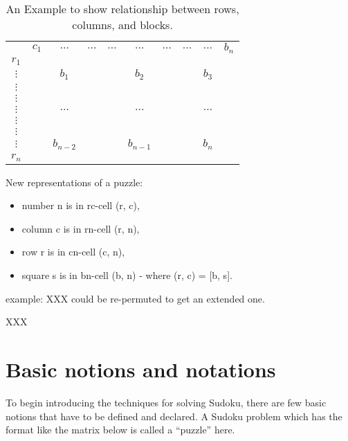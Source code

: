 \documentclass[11pt]{report}
\begin{document}
\begin{table}
\centering
\begin{tabular}{ c| c c c| c c c| c c c|}
  \multicolumn{1}{c}{} & $c_{1}$ &  $\dots$ & \multicolumn{1}{c}{$\dots$} & $\dots$ & $\dots$ & \multicolumn{1}{c}{$\dots$} & $\dots$ & $\dots$ & \multicolumn{1}{c}{$b_{n}$}\\ \cline{2-10}
   $r_{1}$ & & & & & & & & &\\
   $\vdots$ & & $b_{1}$ & & & $b_{2}$ & & & $b_{3}$ &\\
   $\vdots$ & & & & & & & & &\\ \cline{2-10}
   $\vdots$ & & & & & & & & &\\
   $\vdots$ & & $\dots$ & & & $\dots$ & & & $\dots$ &\\
   $\vdots$ & & & & & & & & &\\ \cline{2-10}
   $\vdots$ & & & & & & & & &\\
   $\vdots$ & & $b_{n-2}$ & & & $b_{n-1}$ & & & $b_{n}$ &\\
   $r_{n}$ & & & & & & & & &\\ \cline{2-10}
\end{tabular}
\label{blockOrder}
\caption{An Example to show relationship between rows, columns, and blocks.}
\end{table}
  
New representations of a puzzle:
\begin{itemize}
\item number n is in rc-cell (r, c),
\item column c is in rn-cell (r, n),
\item row r is in cn-cell (c, n),
\item square s is in bn-cell (b, n) - where (r, c) = [b, s].
\end{itemize}

example: XXX could be re-permuted to get an extended one.

\cite{Berthier2007Sudoku} XXX





\section{Basic notions and notations}
\label{sec:basicnotnotat}

To begin introducing the techniques for solving Sudoku, there are few basic notions that have to be defined and declared.
A Sudoku problem which has the format like the matrix below is called a  ``puzzle'' here.
\end{document}
